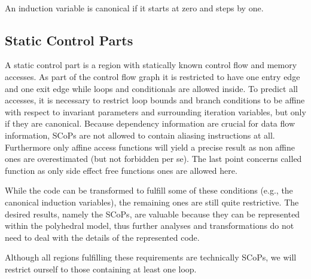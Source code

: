\begin{definition} ~\\
  An induction variable is canonical if it starts at zero and steps by one.
  \label{def:CanonicalInductionVariable}
\end{definition}

\subsection{Static Control Parts}
A static control part is a region with statically known control flow and memory
accesses. As part of the control flow graph it is restricted to have one entry
edge and one exit edge while loops and conditionals are allowed inside.
To predict all accesses, it is necessary to restrict loop bounds and branch 
conditions to be affine with respect to invariant parameters 
and surrounding iteration variables, but only if they are canonical. 
Because dependency information are crucial for data flow information,
SCoPs are not allowed to contain aliasing instructions at all. 
Furthermore only affine access functions will yield a precise result as 
non affine ones are overestimated (but not forbidden per se).
The last point concerns called function as only side effect free functions
ones are allowed here.

While the code can be transformed to fulfill some of these conditions 
(e.g., the canonical induction variables), the remaining ones are still 
quite restrictive. The desired results, namely the SCoPs, are valuable because
they can be represented within the polyhedral model, thus further analyses and
transformations do not need to deal with the details of the represented code.

Although all regions fulfilling these requirements are
technically SCoPs, we will restrict ourself to those containing at least one loop.

